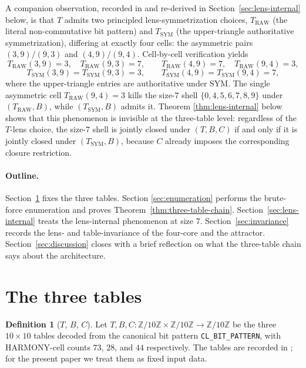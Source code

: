 \documentclass[11pt,reqno]{amsart}
\theoremstyle{definition}
\newtheorem{definition}[theorem]{Definition}
\newcommand{\Z}{\mathbb{Z}}
\newcommand{\TRAW}{T_{\mathrm{RAW}}}
\newcommand{\TSYM}{T_{\mathrm{SYM}}}
\begin{document}
A companion observation, recorded in
\cite{Gen13WP115,Sanders2026FourCore} and re-derived in
Section~\ref{sec:lens-internal} below, is that $T$ admits two
principled lens-symmetrization choices, $\TRAW$ (the literal
non-commutative bit pattern) and $\TSYM$ (the upper-triangle
authoritative symmetrization), differing at exactly four cells:
the asymmetric pairs $(3,9)/(9,3)$ and $(4,9)/(9,4)$.
Cell-by-cell verification yields
\[
  \TRAW(3,9) = 3,\quad \TRAW(9,3) = 7,\qquad
  \TRAW(4,9) = 7,\quad \TRAW(9,4) = 3,
\]
\[
  \TSYM(3,9) = \TSYM(9,3) = 3,\qquad
  \TSYM(4,9) = \TSYM(9,4) = 7,
\]
where the upper-triangle entries are authoritative under SYM. The
single asymmetric cell $\TRAW(9,4) = 3$ kills the size-$7$ shell
$\{0,4,5,6,7,8,9\}$ under $(\TRAW, B)$, while $(\TSYM, B)$ admits
it. Theorem \ref{thm:lens-internal} below shows that this
phenomenon is invisible at the three-table level: regardless of
the $T$-lens choice, the size-$7$ shell is jointly closed under
$(T,B,C)$ if and only if it is jointly closed under $(\TSYM, B)$,
because $C$ already imposes the corresponding closure
restriction.

\paragraph{Outline.}

Section~\ref{sec:tables} fixes the three tables. Section
\ref{sec:enumeration} performs the brute-force enumeration and
proves Theorem~\ref{thm:three-table-chain}.
Section~\ref{sec:lens-internal} treats the lens-internal
phenomenon at size $7$.
Section~\ref{sec:invariance} records the lens- and
table-invariance of the four-core and the attractor.
Section~\ref{sec:discussion} closes with a brief reflection on
what the three-table chain says about the architecture.

\section{The three tables}
\label{sec:tables}

\begin{definition}[$T$, $B$, $C$]
\label{def:tables}
Let $T,B,C : \Z/10\Z\times\Z/10\Z \to \Z/10\Z$ be the three
$10\times 10$ tables decoded from the canonical bit pattern
\texttt{CL\_BIT\_PATTERN}, with HARMONY-cell counts $73$, $28$,
and $44$ respectively. The tables are recorded in
\cite{Gen13Foundations}; for the present paper we treat them as
fixed input data.
\end{definition}
\end{document}
